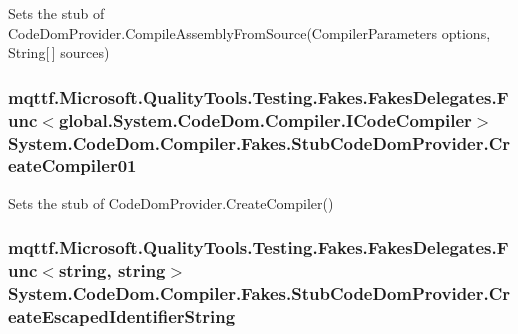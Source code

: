 Sets the stub of Code\-Dom\-Provider.\-Compile\-Assembly\-From\-Source(\-Compiler\-Parameters options, String\mbox{[}$\,$\mbox{]} sources)

\hypertarget{class_system_1_1_code_dom_1_1_compiler_1_1_fakes_1_1_stub_code_dom_provider_a38ea8018f53db24bf4fa0f7999b155c5}{
\subsubsection[{Create\-Compiler01}]{\setlength{\rightskip}{0pt plus 5cm}mqttf.\-Microsoft.\-Quality\-Tools.\-Testing.\-Fakes.\-Fakes\-Delegates.\-Func$<$global.\-System.\-Code\-Dom.\-Compiler.\-I\-Code\-Compiler$>$ System.\-Code\-Dom.\-Compiler.\-Fakes.\-Stub\-Code\-Dom\-Provider.\-Create\-Compiler01}}\label{class_system_1_1_code_dom_1_1_compiler_1_1_fakes_1_1_stub_code_dom_provider_a38ea8018f53db24bf4fa0f7999b155c5}


Sets the stub of Code\-Dom\-Provider.\-Create\-Compiler()

\hypertarget{class_system_1_1_code_dom_1_1_compiler_1_1_fakes_1_1_stub_code_dom_provider_ad7406bb232a2919cefdc4b45207b030c}{
\subsubsection[{Create\-Escaped\-Identifier\-String}]{\setlength{\rightskip}{0pt plus 5cm}mqttf.\-Microsoft.\-Quality\-Tools.\-Testing.\-Fakes.\-Fakes\-Delegates.\-Func$<$string, string$>$ System.\-Code\-Dom.\-Compiler.\-Fakes.\-Stub\-Code\-Dom\-Provider.\-Create\-Escaped\-Identifier\-String}}\label{class_system_1_1_code_dom_1_1_compiler_1_1_fakes_1_1_stub_code_dom_provider_ad7406bb232a2919cefdc4b45207b030c}


